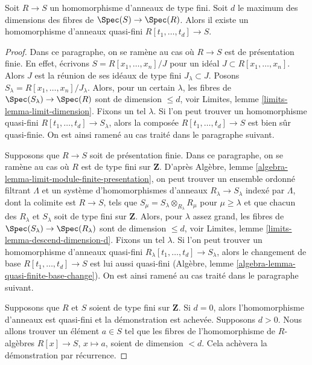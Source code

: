 \begin{lemma}
\label{lemma-weak-relative-noether-normalization}
Soit $R \to S$ un homomorphisme d'anneaux de type fini. Soit $d$ le maximum
des dimensions des fibres de $\Spec(S) \to \Spec(R)$.
Alors il existe un homomorphisme d'anneaux quasi-fini
$R[t_1, \ldots, t_d] \to S$.
\end{lemma}

\begin{proof}
Dans ce paragraphe, on se ramène au cas où $R \to S$ est de présentation
finie. En effet, écrivons $S = R[x_1, \ldots, x_n]/J$ pour un idéal
$J \subset R[x_1, \ldots, x_n]$.
Alors $J$ est la réunion de ses idéaux de type fini $J_\lambda \subset J$.
Posons $S_\lambda = R[x_1, \ldots, x_n]/J_\lambda$.
Alors, pour un certain $\lambda$, les fibres de
$\Spec(S_\lambda) \to \Spec(R)$
sont de dimension $\leq d$, voir Limites, lemme \ref{limits-lemma-limit-dimension}.
Fixons un tel $\lambda$. Si l'on peut trouver un homomorphisme quasi-fini
$R[t_1, \ldots, t_d] \to S_\lambda$, alors la composée
$R[t_1, \ldots, t_d] \to S$ est bien sûr quasi-finie.
On est ainsi ramené au cas traité dans le paragraphe suivant.

\medskip\noindent
Supposons que $R \to S$ soit de présentation finie. Dans ce paragraphe, on se ramène
au cas où $R$ est de type fini sur $\mathbf{Z}$. D'après
Algèbre, lemme \ref{algebra-lemma-limit-module-finite-presentation},
on peut trouver un ensemble ordonné filtrant $\Lambda$ et un système d'homomorphismes d'anneaux
$R_\lambda \to S_\lambda$ indexé par $\Lambda$, dont la colimite est
$R \to S$, tels que $S_\mu = S_\lambda \otimes_{R_\lambda} R_\mu$
pour $\mu \geq \lambda$ et
que chacun des $R_\lambda$ et $S_\lambda$ soit de type
fini sur $\mathbf{Z}$.
Alors, pour $\lambda$ assez grand, les fibres de
$\Spec(S_\lambda) \to \Spec(R_\lambda)$
sont de dimension $\leq d$, voir
Limites, lemme \ref{limits-lemma-descend-dimension-d}.
Fixons un tel $\lambda$. Si l'on peut trouver un homomorphisme d'anneaux quasi-fini
$R_\lambda[t_1, \ldots, t_d] \to S_\lambda$, alors le changement de base
$R[t_1, \ldots, t_d] \to S$ est lui aussi quasi-fini
(Algèbre, lemme \ref{algebra-lemma-quasi-finite-base-change}).
On est ainsi ramené au cas traité dans le paragraphe suivant.

\medskip\noindent
Supposons que $R$ et $S$ soient de type fini sur $\mathbf{Z}$. Si $d = 0$, alors
l'homomorphisme d'anneaux est quasi-fini et la démonstration est achevée. Supposons $d > 0$.
Nous allons trouver un élément $a \in S$ tel que
les fibres de l'homomorphisme de $R$-algèbres $R[x] \to S$, $x \mapsto a$,
soient de dimension $< d$. Cela achèvera la démonstration par récurrence.


\end{proof}
